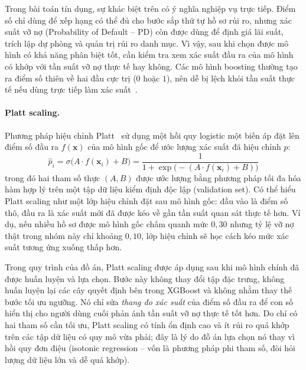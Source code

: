 \documentclass[12pt,a4paper,oneside]{report}
\theoremstyle{vnplain}
\theoremstyle{vndef}
\newcommand{\xv}{\mathbf{x}}
\begin{document}
Trong bài toán tín dụng, sự khác biệt trên có ý nghĩa nghiệp vụ trực tiếp. Điểm số chỉ dùng để xếp hạng có thể đủ cho bước sắp thứ tự hồ sơ rủi ro, nhưng xác suất vỡ nợ (Probability of Default -- PD) còn được dùng để định giá lãi suất, trích lập dự phòng và quản trị rủi ro danh mục. Vì vậy, sau khi chọn được mô hình có khả năng phân biệt tốt, cần kiểm tra xem xác suất đầu ra của mô hình có khớp với tần suất vỡ nợ thực tế hay không. Các mô hình boosting thường tạo ra điểm số thiên về hai đầu cực trị ($0$ hoặc $1$), nên dễ bị lệch khỏi tần suất thực tế nếu dùng trực tiếp làm xác suất~\cite{niculescu2005}.

\paragraph{Platt scaling.} Phương pháp hiệu chỉnh Platt~\cite{platt1999} sử dụng một hồi quy logistic một biến áp đặt lên điểm số đầu ra $f(\xv)$ của mô hình gốc để ước lượng xác suất đã hiệu chỉnh $\hat{p}$:
\begin{equation}
  \hat{p}_i = \sigma\big(A \cdot f(\xv_i) + B\big) = \frac{1}{1 + \exp\big(-(A \cdot f(\xv_i) + B)\big)}
  \label{eq:platt}
\end{equation}
trong đó hai tham số thực $(A, B)$ được ước lượng bằng phương pháp tối đa hóa hàm hợp lý trên một tập dữ liệu kiểm định độc lập (validation set). Có thể hiểu Platt scaling như một lớp hiệu chỉnh đặt sau mô hình gốc: đầu vào là điểm số thô, đầu ra là xác suất mới đã được kéo về gần tần suất quan sát thực tế hơn. Ví dụ, nếu nhiều hồ sơ được mô hình gốc chấm quanh mức $0{,}30$ nhưng tỷ lệ vỡ nợ thật trong nhóm này chỉ khoảng $0{,}10$, lớp hiệu chỉnh sẽ học cách kéo mức xác suất tương ứng xuống thấp hơn.

Trong quy trình của đồ án, Platt scaling được áp dụng sau khi mô hình chính đã được huấn luyện và lựa chọn. Bước này không thay đổi tập đặc trưng, không huấn luyện lại các cây quyết định bên trong XGBoost và không nhằm thay thế bước tối ưu ngưỡng. Nó chỉ sửa \emph{thang đo xác suất} của điểm số đầu ra để con số hiển thị cho người dùng cuối phản ánh tần suất vỡ nợ thực tế tốt hơn. Do chỉ có hai tham số cần tối ưu, Platt scaling có tính ổn định cao và ít rủi ro quá khớp trên các tập dữ liệu có quy mô vừa phải; đây là lý do đồ án lựa chọn nó thay vì hồi quy đơn điệu (isotonic regression -- vốn là phương pháp phi tham số, đòi hỏi lượng dữ liệu lớn và dễ quá khớp).
\end{document}

